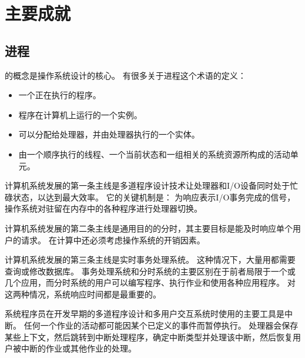 
\section{主要成就}
{
    \subsection{进程}
    {
        的概念是操作系统设计的核心。
        有很多关于进程这个术语的定义：

        \begin{itemize}
            \item 一个正在执行的程序。
            \item 程序在计算机上运行的一个实例。
            \item 可以分配给处理器，并由处理器执行的一个实体。
            \item 由一个顺序执行的线程、一个当前状态和一组相关的系统资源所构成的活动单元。
        \end{itemize}

        计算机系统发展的第一条主线是多道程序设计技术让处理器和I/O设备同时处于忙碌状态，以达到最大效率。
        它的关键机制是：
        为响应表示I/O事务完成的信号，操作系统对驻留在内存中的各种程序进行处理器切换。

        计算机系统发展的第二条主线是通用目的的分时，其主要目标是能及时响应单个用户的请求。
        在计算中还必须考虑操作系统的开销因素。

        计算机系统发展的第三条主线是实时事务处理系统。
        这种情况下，大量用都需要查询或修改数据库。
        事务处理系统和分时系统的主要区别在于前者局限于一个或几个应用，而分时系统的用户可以编写程序、执行作业和使用各种应用程序。
        对这两种情况，系统响应时间都是最重要的。

        系统程序员在开发早期的多道程序设计和多用户交互系统时使用的主要工具是中断。
        任何一个作业的活动都可能因某个已定义的事件而暂停执行。
        处理器会保存某些上下文，然后跳转到中断处理程序，确定中断类型并处理该中断，然后恢复用户被中断的作业或其他作业的处理。
    }
}
